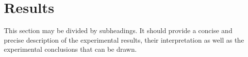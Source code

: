 \section{Results}

This section may be divided by subheadings. It should provide a concise and precise description of the experimental results, their interpretation as well as the experimental conclusions that can be drawn.